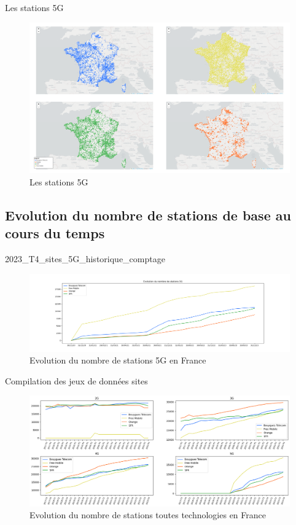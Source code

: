 \begin{frame}{Les stations 5G}
    \begin{figure}
        \includegraphics[width=0.9\paperheight]{images/cartes/providers-site_5g.png}
        \caption{\label{fig:sp-5g}Les stations 5G}
    \end{figure}
\end{frame}


\subsection{Evolution du nombre de stations de base au cours du temps}
\insertsubsectionframe

\begin{frame}{2023\_T4\_sites\_5G\_historique\_comptage}
    \begin{figure}
        \includegraphics[height=0.5\paperheight]{images/5G-evolution.png}
        \caption{\label{fig:5G-ev}Evolution du nombre de stations 5G en France}
    \end{figure}
\end{frame}


\begin{frame}{Compilation des jeux de données sites}
    \begin{figure}
        \includegraphics[width=0.78\paperwidth]{images/technos-evolution.png}
        \caption{\label{fig:techno-ev} Evolution du nombre de stations toutes technologies en France}
    \end{figure}
\end{frame}

